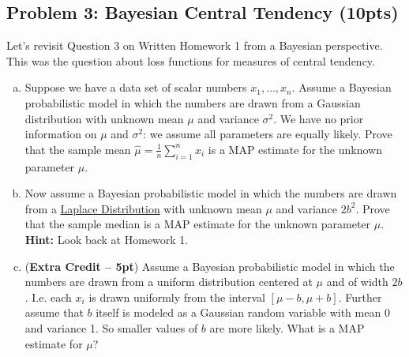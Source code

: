 \documentclass[10pt]{article}
\begin{document}
\subsection{Problem 3: Bayesian Central Tendency (10pts)}
Let's revisit Question 3 on Written Homework 1 from a Bayesian perspective. This was the question about loss functions for measures of central tendency. 
\begin{enumerate}[(a)]
	\item Suppose we have a data set of scalar numbers $x_1, \ldots, x_n$. Assume a Bayesian probabilistic model in which the numbers are drawn from a Gaussian distribution with unknown mean $\mu$ and variance $\sigma^2$. We have no prior information on $\mu$ and  $\sigma^2$: we assume all parameters are equally likely. Prove that the sample mean $\hat{\mu} = \frac{1}{n}\sum_{i=1}^n x_i$ is a MAP estimate for the unknown parameter $\mu$.
	
	\item Now assume a Bayesian probabilistic model in which the numbers are drawn from a \href{https://en.wikipedia.org/wiki/Laplace_distribution}{Laplace Distribution} with unknown mean $\mu$ and variance $2b^2$. Prove that the sample median is a MAP estimate for the unknown parameter $\mu$. \textbf{Hint:} Look back at Homework 1.

	\item (\textbf{Extra Credit -- 5pt}) Assume a Bayesian probabilistic model in which the numbers are drawn from a uniform distribution centered at $\mu$ and of width $2b$. I.e. each $x_i$ is drawn uniformly from the interval $[\mu-b, \mu + b]$. Further assume that $b$ itself is modeled as a Gaussian random variable with mean 0 and variance 1. So smaller values of $b$ are more likely. What is a MAP estimate for $\mu$?
\end{enumerate}
\end{document}
